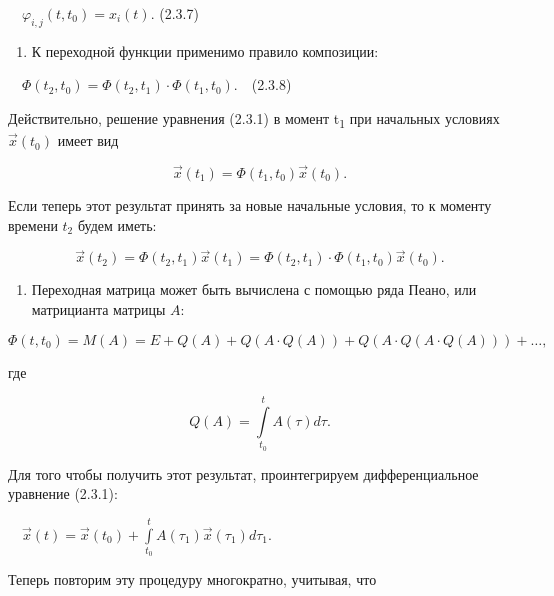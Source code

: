 		\ \  $\varphi _{i,j}(t,t_0)=x_i(t).$  (2.3.7)


\liststyleWWviiiNumlxviii
\begin{enumerate}
	\item 
			К переходной функции применимо правило композиции:
	
\end{enumerate}

		\ \  $\Phi (t_2,t_0)=\Phi (t_2,t_1)\cdot \Phi (t_1,t_0).$\ \ (2.3.8)



		Действительно, решение уравнения (2.3.1) в момент {t}\textsubscript{1} при начальных условиях  $\vec x(t_0)$
		имеет вид


\begin{equation*}
\vec x(t_1)=\Phi (t_1,t_0)\vec x(t_0).
\end{equation*}

		Если теперь этот результат принять за новые начальные условия, то к моменту времени  $t_2$ будем иметь:


\begin{equation*}
\vec x(t_2)=\Phi (t_2,t_1)\vec x(t_1)=\Phi (t_2,t_1)\cdot \Phi (t_1,t_0)\vec x(t_0).
\end{equation*}
\liststyleWWviiiNumlxviii
\setcounter{saveenum}{\value{enumi}}
\begin{enumerate}
	\setcounter{enumi}{\value{saveenum}}
	\item 
			Переходная матрица может быть вычислена с помощью ряда Пеано, или матрицианта матрицы  $A$:
	
\end{enumerate}
\begin{equation*}
\Phi (t,t_0)=M(A)=E+Q(A)+Q(A\cdot Q(A))+Q(A\cdot Q(A\cdot Q(A)))+\ldots ,
\end{equation*}

		где


\begin{equation*}
Q(A)=\overset t{\underset{t_0}{\int }}A(\tau )\mathit{d\tau }.
\end{equation*}

		Для того чтобы получить этот результат, проинтегрируем дифференциальное уравнение (2.3.1):



		\ \  $\vec x(t)=\vec x(t_0)+\overset t{\underset{t_0}{\int }}A(\tau _1)\vec x(\tau _1)\mathit{d\tau }_1$.



		Теперь повторим эту процедуру многократно, учитывая, что


